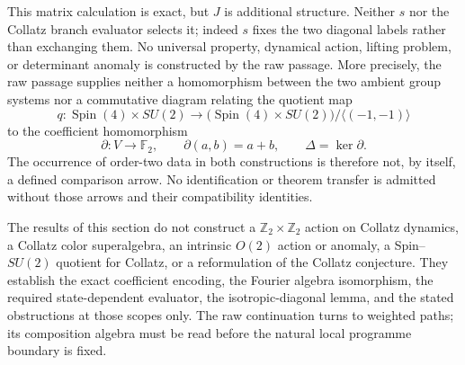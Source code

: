 This matrix calculation is exact, but $J$ is additional structure.  Neither
$s$ nor the Collatz branch evaluator selects it; indeed $s$ fixes the two
diagonal labels rather than exchanging them.  No universal property,
dynamical action, lifting problem, or determinant anomaly is constructed by
the raw passage.  More precisely, the raw passage supplies neither a
homomorphism between the two ambient group systems nor a commutative diagram
relating the quotient map
\[
 q:\operatorname{Spin}(4)\times SU(2)
   \longrightarrow
   \bigl(\operatorname{Spin}(4)\times SU(2)\bigr)/\langle(-1,-1)\rangle
\]
to the coefficient homomorphism
\[
 \partial:V\longrightarrow\mathbb F_2,
 \qquad \partial(a,b)=a+b,
 \qquad \Delta=\ker\partial.
\]
The occurrence of order-two data in both constructions is therefore not, by
itself, a defined comparison arrow.  No identification or theorem transfer is
admitted without those arrows and their compatibility identities.

\begin{nonclaim}
The results of this section do not construct a
$\mathbb Z_2\times\mathbb Z_2$ action on Collatz dynamics, a Collatz color
superalgebra, an intrinsic $O(2)$ action or anomaly, a Spin--$SU(2)$ quotient
for Collatz, or a reformulation of the Collatz conjecture.  They establish the
exact coefficient encoding, the Fourier algebra isomorphism, the required
state-dependent evaluator, the isotropic-diagonal lemma, and the stated
obstructions at those scopes only.  The raw continuation turns to weighted
paths; its composition algebra must be read before the natural local programme
boundary is fixed.
\end{nonclaim}
